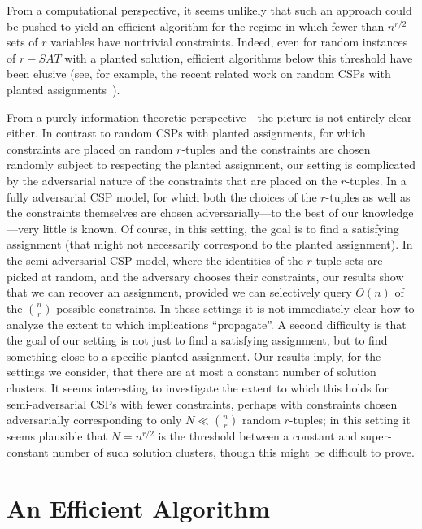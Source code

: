 \documentclass[anon,12pt]{colt2018}
\begin{document}
From a computational perspective, it seems unlikely that such an approach could be pushed to yield an efficient algorithm for the regime in which fewer than $n^{r/2}$ sets of $r$ variables have nontrivial constraints.  Indeed, even for random instances of $r-SAT$ with a planted solution, efficient algorithms below this threshold have been elusive (see, for example, the recent related work on random CSPs with planted assignments~\cite{feldman2015complexity,raghavendra2016strongly}).   


From a purely information theoretic perspective---the picture is not entirely clear either.  In contrast to random CSPs with planted assignments, for which constraints are placed on random $r$-tuples and the constraints are chosen randomly subject to respecting the planted assignment, our setting is complicated by the adversarial nature of the constraints that are placed on the $r$-tuples.  In a fully adversarial CSP model, for which both the choices of the $r$-tuples as well as the constraints themselves are chosen adversarially---to the best of our knowledge---very little is known.  Of course, in this setting, the goal is to find a satisfying assignment (that might not necessarily correspond to the planted assignment).  In the semi-adversarial CSP model, where the identities of the $r$-tuple sets are picked at random, and the adversary chooses their constraints, our results show that we can recover an assignment, provided we can selectively query $O(n)$ of the ${n \choose r}$ possible constraints.  In these settings it is not immediately clear how to analyze the extent to which implications ``propagate''.  A second difficulty is that the goal of our setting is not just to find a satisfying assignment, but to find something close to a specific planted assignment.  Our results imply, for the settings we consider, that there are at most a constant number of solution clusters.  It seems interesting to investigate  the extent to which this holds for semi-adversarial CSPs with fewer constraints, perhaps with constraints chosen adversarially corresponding to only $N \ll {n \choose r}$ random $r$-tuples; in this setting it seems plausible that $N = n^{r/2}$ is the threshold between a constant and super-constant number of such solution clusters, though this might be difficult to prove.  



\appendix

\section{An Efficient Algorithm}\label{sec:realAlg}
\end{document}
